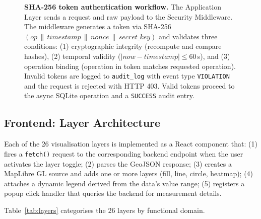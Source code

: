 \documentclass[12pt,a4paper]{article}
\begin{document}
\begin{figure}[H]
\caption[SHA-256 token authentication workflow]{%
  \textbf{SHA-256 token authentication workflow.}
  The Application Layer sends a request and raw payload to the Security
  Middleware. The middleware generates a token via
  SHA-256$(op\,\|\,timestamp\,\|\,nonce\,\|\,secret\_key)$ and validates three
  conditions: (1) cryptographic integrity (recompute and compare hashes),
  (2) temporal validity ($|now - timestamp| \leq 60$\,s), and (3) operation
  binding (operation in token matches requested operation). Invalid tokens are
  logged to \texttt{audit\_log} with event type \texttt{VIOLATION} and the
  request is rejected with HTTP 403. Valid tokens proceed to the async SQLite
  operation and a \texttt{SUCCESS} audit entry.}
\label{fig:tokenflow}
\end{figure}

\subsection{Frontend: Layer Architecture}
\label{sec:impl:layers}

Each of the 26 visualisation layers is implemented as a React component that:
(1) fires a \texttt{fetch()} request to the corresponding backend endpoint when
the user activates the layer toggle; (2) parses the GeoJSON response; (3) creates
a MapLibre GL source and adds one or more layers (fill, line, circle, heatmap);
(4) attaches a dynamic legend derived from the data's value range; (5) registers
a popup click handler that queries the backend for measurement details.

Table~\ref{tab:layers} categorises the 26 layers by functional domain.
\end{document}

